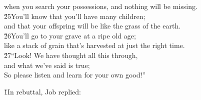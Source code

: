 \begin{poetry}
\poemll    when you search your possessions, and nothing will be missing. \\
\poeml \v{25}You'll know that you'll have many children; \\
\poemll    and that your offspring will be like the grass of the earth. \\
\poeml \v{26}You'll go to your grave at a ripe old age; \\
\poemll    like a stack of grain that's harvested at just the right time. \\
\poeml \v{27}``Look! We have thought all this through, \\
\poemll    and what we've said is true; \\
\poemlll       So please listen and learn for your own good!''
\end{poetry}

\v{1}In rebuttal, Job replied:

